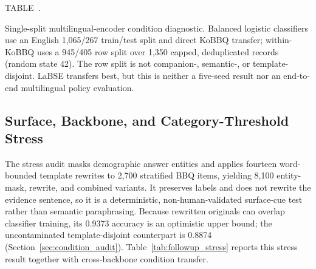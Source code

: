 \documentclass{ieeeaccess}
\newcommand{\inlinetablecaption}[2]{%
  \par\vspace{0.62\baselineskip}\noindent
  \refstepcounter{table}\label{#1}%
  {\color{accessblue}\tablecapheadfont TABLE~\thetable.\ }%
  {\tablecapfont #2\par}%
  \vspace{6pt}%
}
\begin{document}
\noindent\begin{minipage}{\columnwidth}
\inlinetablecaption{tab:multilingual_condition}{Single-split multilingual-encoder condition diagnostic. Balanced logistic classifiers use an English 1,065/267 train/test split and direct KoBBQ transfer; within-KoBBQ uses a 945/405 row split over 1,350 capped, deduplicated records (random state 42). The row split is not companion-, semantic-, or template-disjoint. LaBSE transfers best, but this is neither a five-seed result nor an end-to-end multilingual policy evaluation.}
\begin{center}
\scriptsize
\setlength{\tabcolsep}{1.8pt}
\renewcommand{\arraystretch}{1.04}
\end{center}
\end{minipage}
\par\vspace{0.5\baselineskip}

\subsection{Surface, Backbone, and Category-Threshold Stress}
\label{app:stress_calibration}
The stress audit masks demographic answer entities and applies fourteen word-bounded template rewrites to 2,700 stratified BBQ items, yielding 8,100 entity-mask, rewrite, and combined variants. It preserves labels and does not rewrite the evidence sentence, so it is a deterministic, non-human-validated surface-cue test rather than semantic paraphrasing. Because rewritten originals can overlap classifier training, its 0.9373 accuracy is an optimistic upper bound; the uncontaminated template-disjoint counterpart is 0.8874 (Section~\ref{sec:condition_audit}).
Table~\ref{tab:followup_stress} reports this stress result together with cross-backbone condition transfer.
\end{document}
